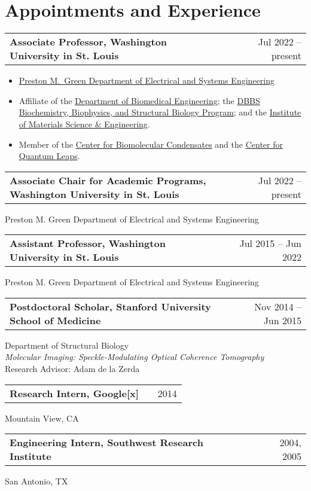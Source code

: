 \documentclass[letter,11pt]{article}
\makeatletter
\newenvironment{jobshort}[2]
    {
    \begin{tabularx}{\linewidth}{@{}l X r@{}}
    \textbf{#1} & \hfill &  #2 \\[3.75pt]
    \end{tabularx}
    }
    {
    }
\newenvironment{joblong}[2]
    {
    \begin{tabularx}{\linewidth}{@{}l X r@{}}
    \textbf{#1} & \hfill &  #2 \\[3.75pt]
    \end{tabularx}
    \begin{minipage}[t]{\linewidth}
    \begin{itemize}[nosep,after=\strut, leftmargin=1em, itemsep=3pt,label=--]
    }
    {
    \end{itemize}
    \end{minipage}    
    }
\makeatother
\begin{document}
\section{Appointments and Experience}

\begin{joblong}{Associate Professor, Washington University in St. Louis}{Jul 2022 -- present}
\item \href{https://ese.washu.edu}{Preston M.\ Green Department of Electrical and Systems Engineering}
\item Affiliate of the \href{https://bme.washu.edu}{Department of Biomedical Engineering}; the \href{https://dbbs.wustl.edu/programs/biochemistry-biophysics-structural-biology/}{DBBS Biochemistry, Biophysics, and Structural Biology Program}; and the \href{https://imse.washu.edu}{Institute of Materials Science \& Engineering}.
\item Member of the \href{https://condensates.wustl.edu}{Center for Biomolecular Condensates} and the \href{https://quantumleaps.wustl.edu/}{Center for Quantum Leaps}.
\end{joblong}

\begin{jobshort}{Associate Chair for Academic Programs, Washington University in St. Louis}{Jul 2022 -- present}
Preston M. Green Department of Electrical and Systems Engineering
\end{jobshort}

\begin{jobshort}{Assistant Professor, Washington University in St. Louis}{Jul 2015 -- Jun 2022}
Preston M. Green Department of Electrical and Systems Engineering
\end{jobshort}

\begin{jobshort}{Postdoctoral Scholar, Stanford University School of Medicine}{Nov 2014 -- Jun 2015}
Department of Structural Biology \\
\emph{Molecular Imaging: Speckle-Modulating Optical Coherence Tomography} \\
Research Advisor: Adam de la Zerda
\end{jobshort}

\begin{jobshort}{Research Intern, Google[x]}{2014}
Mountain View, CA
\end{jobshort}

\begin{jobshort}{Engineering Intern, Southwest Research Institute}{2004, 2005}
San Antonio, TX
\end{jobshort}
  
\end{document}
